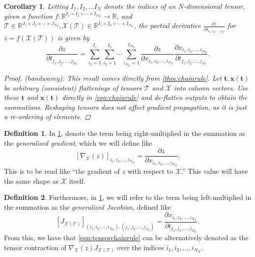 \documentclass{article}
\renewcommand{\vec}[1]{\bm{{#1}}}
\newcommand{\tensor}[1]{\bm{{\mathcal{#1}}}}
\newcommand{\gradfn}[2]{\nabla_{{#1}}\left({#2}\right)}
\newtheorem{corollary}{Corollary}[theorem]
\theoremstyle{definition}
\newtheorem{definition}{Definition}[section]
\begin{document}
\begin{corollary}
  Letting $I_1, I_2, \ldots I_N$ denote the indices of an $N$-dimensional tensor, given a function $f : \mathbb{R}^{I_1 \times I_2 \times \cdots \times I_{N_X}} \to \mathbb{R}$, and $\tensor{T}\in \mathbb{R}^{J_1 \times J_2 \times \cdots \times J_{N_T}}, \tensor{X}\left(\tensor{T}\right) \in \mathbb{R}^{I_1 \times I_2 \times \cdots \times I_{N_X}}$, the partial derivative $\frac{\partial z}{\partial t_{i_1,i_2,\ldots,i_N}}$ for $z=f\left(\tensor{X}\left(\tensor{T}\right)\right)$ is given by
  \begin{equation}
    \frac{\partial z}{\partial t_{j_1,j_2,\ldots,j_{N_T}}} = \sum_{i_1=1}^{I_1} \sum_{i_2=1}^{I_2} \cdots \sum_{i_{N_X}=1}^{I_{N_X}} \frac{\partial z}{\partial x_{i_1, i_2, \ldots, i_{N_X}}} \frac{\partial x_{i_1, i_2, \ldots, i_{N_X}}}{\partial t_{j_1, j_2, \ldots, j_{N_T}}}. \label{eqn:tensorchainrule}
  \end{equation}
  \begin{proof} (handwavey): This result comes directly from \cref{thm:chainrule}. Let $\vec{t}, \vec{x}\left(\vec{t}\right)$ be arbitrary (consistent) flattenings of tensors $\tensor{T}$ and $\tensor{X}$ into column vectors.  Use these $\vec{t}$ and $\vec{x}\left(\vec{t}\right)$ directly in \cref{eqn:chainrule} and de-flatten outputs to obtain the summations.  Reshaping tensors does not affect gradient propagation, as it is just a re-ordering of elements. \end{proof}
  \label{cor:tensorchainrule}
\end{corollary}

\begin{definition}
  In \cref{cor:tensorchainrule}, denote the term being right-multiplied in the summation as the \textit{generalized gradient}, which we will define like
  \begin{equation}
    \left[\gradfn{\tensor{X}}{z}\right]_{i_1,i_2,\ldots,i_{N_X}} = \frac{\partial z}{\partial x_{i_1,i_2,\ldots,i_{N_X}}}. \label{eqn:gradfn}
  \end{equation}
  This is to be read like ``the gradient of $z$ with respect to $\tensor{X}$.''  This value will have the same shape as $\tensor{X}$ itself.
\end{definition}

\begin{definition}
  Furthermore, in \cref{cor:tensorchainrule}, we will refer to the term being left-multiplied in the summation as the \textit{generalized Jacobian}, defined like
  \begin{equation}
    \left[J_{\tensor{X}\left(\tensor{T}\right)}\right]_{\left(i_1, i_2, \ldots, i_{N_X}\right), \left(j_1, j_2, \ldots, j_{N_T}\right)} = \frac{\partial x_{i_1, i_2, \ldots, i_{N_X}}}{\partial t_{j_1, j_2, \ldots, j_{N_T}}}. \label{eqn:jacfn}
  \end{equation}
  From this, we have that \cref{eqn:tensorchainrule} can be alternatively denoted as the tensor contraction of $\gradfn{\tensor{X}}{z}J_{\tensor{X}\left(\tensor{T}\right)}$ over the indices $i_1, i_2, \ldots, i_{N_X}$.
\end{definition}
\end{document}
